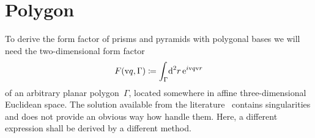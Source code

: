 
\section{Polygon}\label{SFFPolygon}

%
\def\R{\v{R}}
\def\E{\v{E}}
\def\Gp{\Gamma_\parallel}
\def\x{\v{x}}
\def\V{\v{V}}
\def\qp{\v{p}}
\def\n{\v{\hat n}}
\def\uq{\v{\hat q}}
\def\uqp{\v{\hat p}}

To derive the form factor of prisms and pyramids with polygonal bases
we will need the two-dimensional form factor
\begin{equation}\label{Eff2d}
  F(\text{v}{q},\Gamma)
  \coloneqq \int_{\Gamma}\!\text{d}^2r\, \text{e}^{i\text{v}{q}\text{v}{r}}
\end{equation}
of an arbitrary planar polygon~$\Gamma$,
located somewhere in affine three-dimensional Euclidean space.
The solution available from the literature~\cite{LeMi83}
contains singularities and does not provide an obvious way how handle them.
Here, a different expression shall be derived by a different method.

